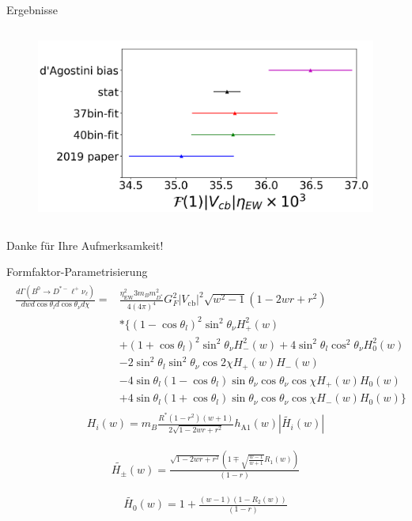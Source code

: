 \documentclass{beamer}
\begin{document}
\begin{frame}{Ergebnisse}
\begin{columns}
\begin{figure}[htbp]
    \includegraphics[width=1.0\textwidth]{./Bilder/CLN_all_4}
\end{figure}  
\end{columns}
\vfill
\end{frame}

\begin{frame}{}

  \centering\Huge
  Danke für Ihre Aufmerksamkeit!
\end{frame}

\appendix


\begin{frame}{Formfaktor-Parametrisierung}
\footnotesize
\begin{align}
\begin{split}
\frac{d \Gamma   (B^0\longrightarrow D^{*-} \ell ^+ \nu_{\ell})}{dw d \cos \theta_l d \cos \theta_{\nu}d \chi}= & \frac{\eta _{\text{EW}}^2 3 m_{B} m_{D^{*}}^2  }{4 (4 \pi) ^4} G_F^2 |V_{\text{cb}} {}|^2  \sqrt{w^2-1} (1-2wr + r^2)\\
& *\{(1-\cos \theta_l)^2 \sin ^2 \theta_{\nu} H_+^2(w)\\
& +(1+\cos \theta_l)^2 \sin^2\theta_{\nu} H_-^2(w) + 4 \sin^2 \theta_l \cos^2 \theta_{\nu} H_0^2 (w)\\ 
& - 2 \sin^2 \theta_l \sin^2 \theta_{\nu} \cos 2 \chi H_+(w)H_-(w) \\
& - 4 \sin \theta_l (1-\cos \theta_l) \sin \theta_{\nu} \cos \theta_{\nu} \cos \chi H_+(w)H_0(w) \\
& + 4 \sin \theta_l (1+\cos \theta_l) \sin \theta_{\nu} \cos \theta_{\nu} \cos \chi H_-(w)H_0(w)\}
\end{split}
\end{align}
\begin{align}
H_i(w)=m_{B} \frac{R^* \left(1-r^2\right)  (w+1) }{2 \sqrt{1-2 w r +r^2}} h_{\text{A1}}(w) |\tilde{H_i}(w)|
\end{align}

\begin{align}
\tilde{H_\pm}(w)=\frac{\sqrt{1-2 w r +r^2} \left( 1 \mp \sqrt{\frac{w-1}{w+1}} R_1(w) \right)}{(1-r)} 
\end{align}

\begin{align}
\tilde{H_0}(w)=1+ \frac{(w-1)(1-R_2(w))}{(1-r)}
\end{align}
\end{frame}
\end{document}

